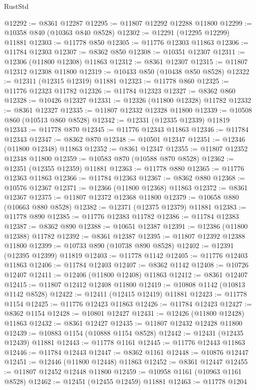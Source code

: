 \begin{lexlean}{RustStd}
\begin{coremodule}
@12292 := @8361 @12287
@12295 := @11807 @12292 @12288 @11800
@12299 := @10358 @840 (@10363 @840 @8528)
@12302 := @12291 (@12295 @12299) @11881
@12303 := @11778 @850
@12305 := @11776 @12303 @11863
@12306 := @11784 @12303
@12307 := @8362 @850
@12308 := @10351 @12307
@12311 := @12306 (@11800 @12308) @11863
@12312 := @8361 @12307
@12315 := @11807 @12312 @12308 @11800
@12319 := @10433 @850 (@10438 @850 @8528)
@12322 := @12311 (@12315 @12319) @11881
@12323 := @11778 @860
@12325 := @11776 @12323 @11782
@12326 := @11784 @12323
@12327 := @8362 @860
@12328 := @10426 @12327
@12331 := @12326 (@11800 @12328) @11782
@12332 := @8361 @12327
@12335 := @11807 @12332 @12328 @11800
@12339 := @10508 @860 (@10513 @860 @8528)
@12342 := @12331 (@12335 @12339) @11819
@12343 := @11778 @870
@12345 := @11776 @12343 @11863
@12346 := @11784 @12343
@12347 := @8362 @870
@12348 := @10501 @12347
@12351 := @12346 (@11800 @12348) @11863
@12352 := @8361 @12347
@12355 := @11807 @12352 @12348 @11800
@12359 := @10583 @870 (@10588 @870 @8528)
@12362 := @12351 (@12355 @12359) @11881
@12363 := @11778 @880
@12365 := @11776 @12363 @11863
@12366 := @11784 @12363
@12367 := @8362 @880
@12368 := @10576 @12367
@12371 := @12366 (@11800 @12368) @11863
@12372 := @8361 @12367
@12375 := @11807 @12372 @12368 @11800
@12379 := @10658 @880 (@10663 @880 @8528)
@12382 := @12371 (@12375 @12379) @11881
@12383 := @11778 @890
@12385 := @11776 @12383 @11782
@12386 := @11784 @12383
@12387 := @8362 @890
@12388 := @10651 @12387
@12391 := @12386 (@11800 @12388) @11782
@12392 := @8361 @12387
@12395 := @11807 @12392 @12388 @11800
@12399 := @10733 @890 (@10738 @890 @8528)
@12402 := @12391 (@12395 @12399) @11819
@12403 := @11778 @1142
@12405 := @11776 @12403 @11863
@12406 := @11784 @12403
@12407 := @8362 @1142
@12408 := @10726 @12407
@12411 := @12406 (@11800 @12408) @11863
@12412 := @8361 @12407
@12415 := @11807 @12412 @12408 @11800
@12419 := @10808 @1142 (@10813 @1142 @8528)
@12422 := @12411 (@12415 @12419) @11881
@12423 := @11778 @1154
@12425 := @11776 @12423 @11863
@12426 := @11784 @12423
@12427 := @8362 @1154
@12428 := @10801 @12427
@12431 := @12426 (@11800 @12428) @11863
@12432 := @8361 @12427
@12435 := @11807 @12432 @12428 @11800
@12439 := @10883 @1154 (@10888 @1154 @8528)
@12442 := @12431 (@12435 @12439) @11881
@12443 := @11778 @1161
@12445 := @11776 @12443 @11863
@12446 := @11784 @12443
@12447 := @8362 @1161
@12448 := @10876 @12447
@12451 := @12446 (@11800 @12448) @11863
@12452 := @8361 @12447
@12455 := @11807 @12452 @12448 @11800
@12459 := @10958 @1161 (@10963 @1161 @8528)
@12462 := @12451 (@12455 @12459) @11881
@12463 := @11778 @1204

\end{coremodule}
\end{lexlean}

